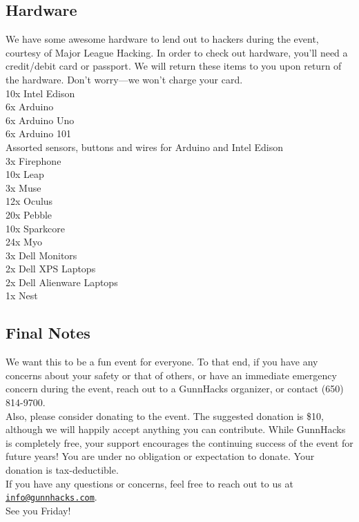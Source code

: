 \documentclass[12pt,onesided,letterpaper]{article}
\begin{document}
\subsection*{Hardware}

We have some awesome hardware to lend out to hackers during the event, courtesy of Major League Hacking. In order to check out hardware, you'll need a credit\slash debit card or passport. We will return these items to you upon return of the hardware. Don't worry---we won't charge your card.\\

10x Intel Edison\\
6x Arduino\\
6x Arduino Uno\\
6x Arduino 101\\
Assorted sensors, buttons and wires for Arduino and Intel Edison\\
3x Firephone\\
10x Leap\\
3x Muse\\
12x Oculus\\
20x Pebble\\
10x Sparkcore\\
24x Myo\\
3x Dell Monitors\\
2x Dell XPS Laptops\\
2x Dell Alienware Laptops\\
1x Nest

\subsection*{Final Notes}

We want this to be a fun event for everyone. To that end, if you have any concerns about your safety or that of others, or have an immediate emergency concern during the event, reach out to a GunnHacks organizer, or contact (650) 814-9700.\\

Also, please consider donating to the event. The suggested donation is \$10, although we will happily accept anything you can contribute. While GunnHacks is completely free, your support encourages the continuing success of the event for future years! You are under no obligation or expectation to donate. Your donation is tax-deductible.\\

If you have any questions or concerns, feel free to reach out to us at \href{mailto:info@gunnhacks.com}{\underline{\texttt{info@gunnhacks.com}}}.\\

See you Friday!
\end{document}
